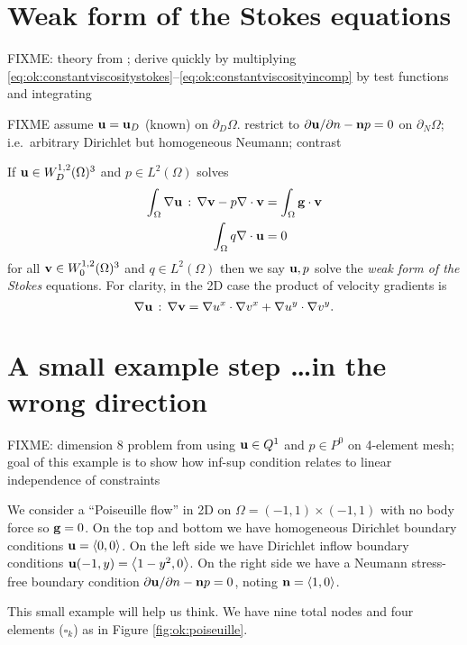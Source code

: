 \section{Weak form of the Stokes equations}

FIXME: theory from \citep{Braess2007,Elmanetal2005}; derive quickly by multiplying \eqref{eq:ok:constantviscositystokes}--\eqref{eq:ok:constantviscosityincomp} by test functions and integrating

FIXME assume $\mathbf{u}=\mathbf{u}_D$ (known) on $\partial_D\Omega$.  restrict to $\partial \mathbf{u}/\partial n - \mathbf{n} p = 0$ on $\partial_N\Omega$; i.e.~arbitrary Dirichlet but homogeneous Neumann; contrast \citep{Elmanetal2005}

If $\mathbf{u} \in W_D^{1,2}(\Omega)^3$ and $p \in L^2(\Omega)$ solves
\begin{align}
\int_\Omega \nabla \mathbf{u} \,:\, \nabla \mathbf{v} - p \nabla\cdot \mathbf{v} &= \int_\Omega \mathbf{g} \cdot \mathbf{v} \label{eq:ok:weakstokesvelocity} \\
\int_\Omega q \nabla\cdot \mathbf{u} &= 0 \label{eq:ok:weakstokespressure}
\end{align}
for all $\mathbf{v} \in W_0^{1,2}(\Omega)^3$ and $q \in L^2(\Omega)$ then we say $\mathbf{u},p$ solve the \emph{weak form of the Stokes} equations.  For clarity, in the 2D case the product of velocity gradients is
     $$\nabla \mathbf{u} \,:\, \nabla \mathbf{v} = \nabla u^x \cdot \nabla v^x + \nabla u^y \cdot \nabla v^y.$$


\section{A small example step \dots in the wrong direction}

FIXME: dimension 8 problem from using $\mathbf{u}\in Q^1$ and $p\in P^0$ on 4-element mesh; goal of this example is to show how inf-sup condition relates to linear independence of constraints

We consider a ``Poiseuille flow'' \citep{Elmanetal2005} in 2D on $\Omega=(-1,1)\times(-1,1)$ with no body force so $\mathbf{g}=0$.  On the top and bottom we have homogeneous Dirichlet boundary conditions $\mathbf{u}=\left<0,0\right>$.  On the left side we have Dirichlet inflow boundary conditions $\mathbf{u}(-1,y) = \left<1-y^2,0\right>$.  On the right side we have a Neumann stress-free boundary condition $\partial \mathbf{u}/\partial n - \mathbf{n} p = 0$, noting $\mathbf{n} = \left<1,0\right>$.

\newcommand{\one}{{\large \mathbb{1}}}

This small example will help us think.  We have nine total nodes and four elements ($\square_k$) as in Figure \ref{fig:ok:poiseuille}.


